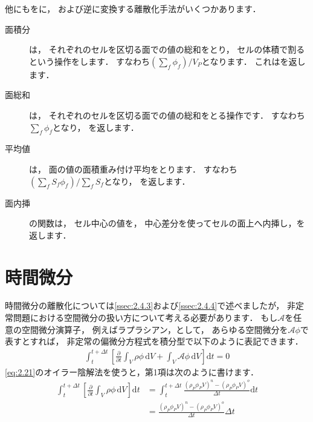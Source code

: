 他にもをに，
および逆に変換する離散化手法がいくつかあります．
\begin{description}
 \item[面積分] は，
            それぞれのセルを区切る面での値の総和をとり，
            セルの体積で割るという操作をします．
            すなわち$(\sum_{f}\phi_{f})/V_{P}$となります．
            これはを返します．
 \item[面総和] は，
            それぞれのセルを区切る面での値の総和をとる操作です．
            すなわち$\sum_{f}\phi_{f}$となり，
            を返します．
 \item[平均値] は，
            面の値の面積重み付け平均をとります．
            すなわち$(\sum_{f}S_{f}\phi_{f})/\sum_{f}S_{f}$となり，
            を返します．
 \item[面内挿] の関数は，
            セル中心の値を，
            中心差分を使ってセルの面上へ内挿し，を返します．
\end{description}



\section{時間微分}
\label{sec:2.5}
時間微分の離散化については\autoref{ssec:2.4.3}および\autoref{ssec:2.4.4}で述べましたが，
非定常問題における空間微分の扱い方について考える必要があります．
もし$\mathcal{A}$を任意の空間微分演算子，
例えばラプラシアン，として，
あらゆる空間微分を$\mathcal{A}\phi$で表すとすれば，
非定常の偏微分方程式を積分型で以下のように表記できます．
\begin{align}
 \label{eq:2.30}
 \int_{t}^{t + \Delta t}\left[\frac{\partial}{\partial t}\int_{V}\rho\phi\,\mathrm{d}V
 + \int_{V}\mathcal{A}\phi\,\mathrm{d}V\right]\mathrm{d}t = 0
\end{align}
\autoref{eq:2.21}のオイラー陰解法を使うと，第1項は次のように書けます．
\begin{align}
 \label{eq:2.31}
 \int_{t}^{t + \Delta t}
 \left[\frac{\partial}{\partial t}\int_{V}\rho\phi\,\mathrm{d}V\right]\mathrm{d}t
 &= \int_{t}^{t + \Delta t}
 \frac{(\rho_{P}\phi_{P}V)^{n} - (\rho_{P}\phi_{P}V)^{o}}{\Delta t}\mathrm{d}t \\
 &= \frac{(\rho_{P}\phi_{P}V)^{n} - (\rho_{P}\phi_{P}V)^{o}}{\Delta t}\Delta t
\end{align}


